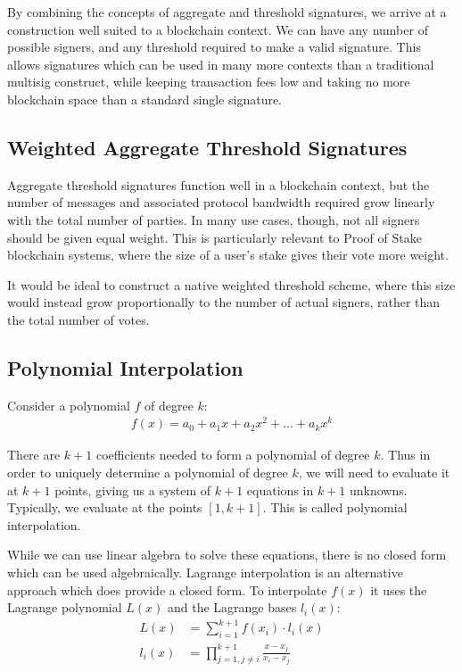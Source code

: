 \documentclass{article}
\theoremstyle{definition}
\theoremstyle{remark}
\begin{document}
By combining the concepts of aggregate and threshold signatures, we arrive at a construction well suited to a blockchain context.  We can have any number of possible signers, and any threshold required to make a valid signature.  This allows signatures which can be used in many more contexts than a traditional multisig construct, while keeping transaction fees low and taking no more blockchain space than a standard single signature.

\subsection{
  Weighted Aggregate Threshold Signatures
}

Aggregate threshold signatures function well in a blockchain context, but the number of messages and associated protocol bandwidth required grow linearly with the total number of parties.  In many use cases, though, not all signers should be given equal weight.  This is particularly relevant to Proof of Stake blockchain systems, where the size of a user's stake gives their vote more weight.

It would be ideal to construct a native weighted threshold scheme, where this size would instead grow proportionally to the number of actual signers, rather than the total number of votes.  

\subsection{
  Polynomial Interpolation
}

Consider a polynomial $f$ of degree $k$:
\begin{align}
  f(x) = a_0 + a_1 x + a_2 x^2 + ... + a_k x^k\nonumber
\end{align}

There are $k+1$ coefficients needed to form a polynomial of degree $k$.  Thus in order to uniquely determine a polynomial of degree $k$, we will need to evaluate it at $k+1$ points, giving us a system of $k+1$ equations in $k+1$ unknowns.  Typically, we evaluate at the points $[1, k+1]$.  This is called polynomial interpolation.

While we can use linear algebra to solve these equations, there is no closed form which can be used algebraically.  Lagrange interpolation \cite{lagrange} is an alternative approach which does provide a closed form.  To interpolate $f(x)$ it uses the Lagrange polynomial $L(x)$ and the Lagrange bases $l_i(x)$:
\begin{align}
  L(x) &= \sum_{i=1}^{k+1} f(x_i) \cdot l_i(x)\\
  l_i(x) &= \prod_{j=1, j \neq i}^{k+1} \frac{x - x_j}{x_i - x_j}
\end{align}
\end{document}
